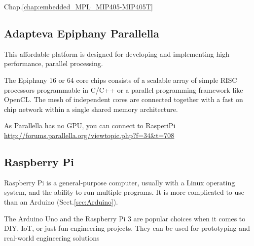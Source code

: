 Chap.\ref{chap:embedded_MPL_MIP405-MIP405T}

\subsection{Adapteva Epiphany Parallella}

This affordable platform is designed for developing and implementing high
performance, parallel processing.

The Epiphany 16 or 64 core chips consists of a scalable array of simple RISC
processors programmable in C/C++ or a parallel programming framework like OpenCL.
The mesh of independent cores are connected together with a fast on chip network
within a single shared memory architecture.

As Parallella has no GPU, you can connect to RasperiPi
\url{http://forums.parallella.org/viewtopic.php?f=34&t=708}

\subsection{Raspberry Pi}
\label{sec:Raspberry-Pi}

Raspberry Pi is a general-purpose computer, usually with a Linux operating
system, and the ability to run multiple programs. It is more complicated to use
than an Arduino (Sect.\ref{sec:Arduino}).

\begin{mdframed}

The Arduino Uno and the Raspberry Pi 3 are popular choices when it comes to DIY,
IoT, or just fun engineering projects. They can be used for prototyping and
real-world engineering solutions


\end{mdframed}

